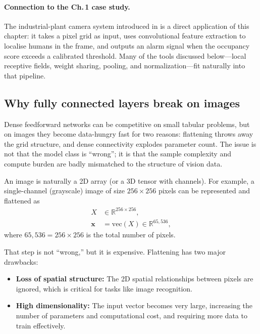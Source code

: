 \paragraph{Connection to the Ch.\,1 case study.}
The industrial-plant camera system introduced in  is a direct application of this chapter: it takes a pixel grid as input, uses convolutional feature extraction to localise humans in the frame, and outputs an alarm signal when the occupancy score exceeds a calibrated threshold. Many of the tools discussed below---local receptive fields, weight sharing, pooling, and normalization---fit naturally into that pipeline.

\subsection{Why fully connected layers break on images}
\label{sec:cnn_why_fully_connected_layers_break_on_images}

Dense feedforward networks can be competitive on small tabular problems, but on images they become data-hungry fast for two reasons: flattening throws away the grid structure, and dense connectivity explodes parameter count. The issue is not that the model class is ``wrong''; it is that the sample complexity and compute burden are badly mismatched to the structure of vision data.

An image is naturally a 2D array (or a 3D tensor with channels). For example, a single-channel (grayscale) image of size $256 \times 256$ pixels can be represented and flattened as
\begin{equation}
\begin{aligned}
X &\in \mathbb{R}^{256 \times 256},\\
\mathbf{x} &= \mathrm{vec}(X) \in \mathbb{R}^{65,536},
\end{aligned}
\label{eq:cnn_image_vectorization}
\end{equation}
where $65,536 = 256 \times 256$ is the total number of pixels.

That step is not ``wrong,'' but it is expensive. Flattening has two major drawbacks:

\begin{itemize}
    \item \textbf{Loss of spatial structure:} The 2D spatial relationships between pixels are ignored, which is critical for tasks like image recognition.
    \item \textbf{High dimensionality:} The input vector becomes very large, increasing the number of parameters and computational cost, and requiring more data to train effectively.
\end{itemize}

